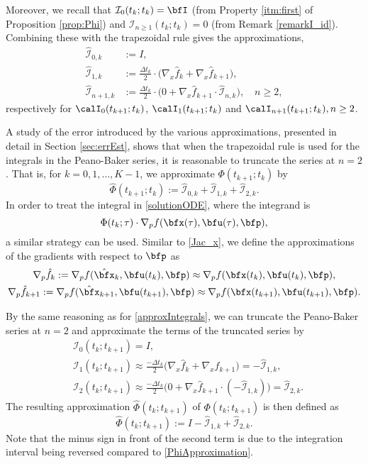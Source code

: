 \documentclass[DIV=12]{scrartcl} %
\theoremstyle{definition}
\begin{document}
Moreover, we recall that $\mathcal{I}_{0}(t_k;t_k)=\bfI$ (from Property \ref{itm:first} of Proposition \ref{prop:Phi}) and $\mathcal{I}_{n\ge1}(t_k;t_k)=0$ (from Remark \ref{remarkI_id}). Combining these with the trapezoidal rule gives the approximations,
\begin{align}
   \hat{\mathcal{I}}_{0,k} &:= I,\nonumber\\
    \hat{\mathcal{I}}_{1,k} &:= \frac{\Delta t_k}{2}\cdot\bigl(  \nabla_x\hat{f}_k + \nabla_x\hat{f}_{k+1}\bigr),\label{approxIntegrals}\\
    \hat{\mathcal{I}}_{n+1,k} &:= \frac{\Delta t_k}{2}\cdot\bigl( 0 + \nabla_x\hat{f}_{k+1}\cdot \hat{\mathcal{I}}_{n,k} \bigr),\quad n\ge2,\nonumber
\end{align}
respectively for $\calI_0(t_{k+1};t_k)$, $\calI_1(t_{k+1};t_k)$ and $\calI_{n+1}(t_{k+1};t_k), n\ge2$.

A study of the error introduced by the various approximations, presented in detail in Section \ref{sec:errEst}, shows that when the trapezoidal rule is used for the integrals in the Peano-Baker series, it is reasonable to truncate the series at $n=2$. That is, for $k=0,1,\dots,K-1$, we approximate $\Phi(t_{k+1};t_k)$ by
\begin{equation}
    \label{PhiApproximation}
\hat{\Phi}(t_{k+1};t_k) := \hat{\mathcal{I}}_{0,k} + \hat{\mathcal{I}}_{1,k} + \hat{\mathcal{I}}_{2,k}.
\end{equation}
In order to treat the integral in \eqref{solutionODE}, where the integrand is 
\[
\Phi(t_k;\tau)\cdot\nabla_pf(\bfx(\tau),\bfu(\tau),\bfp),
\]
a similar strategy can be used. Similar to \eqref{Jac_x}, we define the approximations of the gradients with respect to $\bfp$ as
\begin{gather}
\label{Jac_p}
    \nabla_p\hat{f}_k:=\nabla_pf(\hat \bfx _k,\bfu(t_k),\bfp)\approx \nabla_pf(\bfx(t_k),\bfu(t_k),\bfp),\\
    \nabla_p\hat{f}_{k+1}:=\nabla_pf(\hat \bfx _{k+1},\bfu(t_{k+1}),\bfp)\approx \nabla_pf(\bfx(t_{k+1}),\bfu(t_{k+1}),\bfp).\nonumber
\end{gather}

By the same reasoning as for \eqref{approxIntegrals}, we can truncate the Peano-Baker series at $n=2$ and approximate the terms of the truncated series by
\begin{align*}
    &\mathcal{I}_0(t_{k};t_{k+1}) = I,\\
    &\mathcal{I}_{1}(t_{k};t_{k+1}) \approx \frac{-\Delta t_k}{2}\bigl(  \nabla_x\hat{f}_k + \nabla_x\hat{f}_{k+1}\bigr)=-\hat{\mathcal{I}}_{1,k},\\
    &\mathcal{I}_{2}(t_{k};t_{k+1})\approx \frac{-\Delta t_k}{2}\bigl( 0 + \nabla_x\hat{f}_{k+1}\cdot (-\hat{\mathcal{I}}_{1,k}) \bigr)=\hat{\mathcal{I}}_{2,k}.
\end{align*}
The resulting approximation $\hat \Phi (t_k; t_{k+1}) $ of $\Phi (t_k; t_{k+1})$ is then defined as
\[\hat{\Phi}(t_k;t_{k+1}):=I - \hat{\mathcal{I}}_{1,k} + \hat{\mathcal{I}}_{2,k}.\]
Note that the minus sign in front of the second term is due to the integration interval being reversed compared to \eqref{PhiApproximation}.
\end{document}
